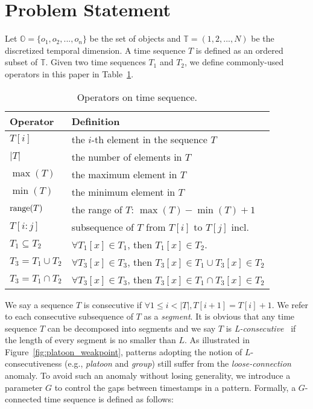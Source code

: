 \section{Problem Statement}
\label{sec:definition}
Let $\mathbb{O} = \{o_1 ,o_2,...,o_n\}$ be the set of objects and $\mathbb{T} =(1,2,...,N)$ be the discretized temporal dimension. A time sequence $T$ is defined as an ordered subset of $\mathbb{T}$. Given two time sequences $T_1$ and $T_2$, we define commonly-used operators in this paper in Table~\ref{tbl:operators}.

\begin{table}[h]
\centering
\caption{Operators on time sequence.}
\label{tbl:operators}
\begin{tabular}{|p{1.7cm}|p{5.8cm}|}
\hline 
\textbf{Operator} & \textbf{Definition} \\ 
\hline
$T[i]$ & the $i$-th element in the sequence $T$ \\ 
\hline
$|T|$ & the number of elements in $T$\\
\hline
$\max(T)$ & the maximum element in $T$\\
\hline
$\min(T)$ & the minimum element in $T$\\
\hline
$\operatorname*{range}(T)$ & the range of $T$: $\max(T) - \min(T) +1$\\ 
\hline 
$T[i:j]$ & subsequence of $T$ from $T[i]$ to $T[j]$ incl. \\ 
\hline
$T_1\subseteq T_2$ &  $\forall T_1[x]\in T_1$, then $T_1[x]\in T_2$. \\\hline
$T_3=T_1\cup T_2$ & $\forall T_3[x]\in T_3$, then $T_3[x]\in T_1 \cup T_3[x] \in T_2$\\ 
\hline
$T_3=T_1\cap T_2$ & $\forall T_3[x]\in T_3$, then $T_3[x]\in T_1 \cap T_3[x] \in T_2$\\ 
\hline
\end{tabular}
\end{table} 

We say a sequence $T$ is consecutive 
if $\forall 1 \leq i < |T|, T[i+1] = T[i] + 1$.  We refer to each consecutive subsequence of $T$ as a \emph{segment}.
It is obvious that any time sequence $T$ can be decomposed into
segments and we say $T$ is \textit{L-consecutive}~\cite{li2015platoon} 
if the length of every segment is no smaller than $L$. As illustrated in Figure~\ref{fig:platoon_weakpoint}, patterns adopting the notion of $L$-consecutiveness (e.g., \emph{platoon} and \emph{group}) still suffer from the \emph{loose-connection} anomaly. 
To avoid such an anomaly without losing generality, we introduce a parameter $G$ to control the gaps between
timestamps in a pattern. Formally, a $G$-connected time sequence is defined as follows:

